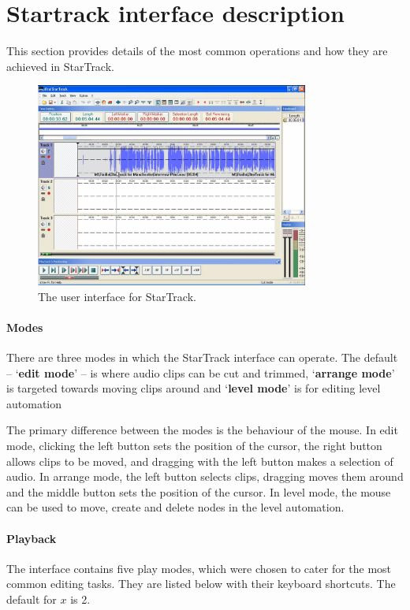 \section{Startrack interface description}\label{app:startrack}
This section provides details of the most common operations and how they are
achieved in StarTrack.

\begin{figure}[ht]
\centering
\includegraphics[width=0.8\textwidth]{figs/startrack.png}
\caption{The user interface for StarTrack.}
\label{fig:startrack}
\end{figure}

\paragraph{Modes}
There are three modes in which the StarTrack interface can operate. The default
-- `\textbf{edit mode}' -- is where audio clips can be cut and trimmed,
`\textbf{arrange mode}' is targeted towards moving clips around and
`\textbf{level mode}' is for editing level automation

The primary difference between the modes is the behaviour of the mouse. In
edit mode, clicking the left button sets the position of the cursor, the right
button allows clips to be moved, and dragging with the left button makes a
selection of audio. In arrange mode, the left button selects clips, dragging
moves them around and the middle button sets the position of the cursor. In
level mode, the mouse can be used to move, create and delete nodes in the level
automation.

\paragraph{Playback}
The interface contains five play modes, which were chosen to cater for the most
common editing tasks. They are listed below with their keyboard shortcuts. The
default for $x$ is 2.

